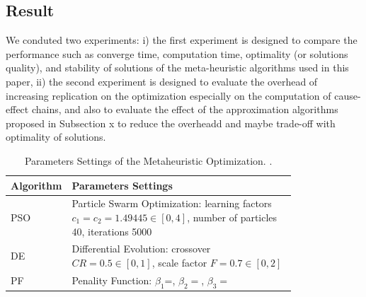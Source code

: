 \subsection{Result}
We conduted two experiments: i) the first experiment is designed to compare the performance  such as converge time, computation time, optimality (or solutions quality), and stability of solutions of the meta-heuristic algorithms used in this paper, ii) the second experiment is designed to evaluate the overhead of increasing replication on the optimization especially on the computation of cause-effect chains, and also to evaluate the effect of the approximation algorithms proposed in Subsection x to reduce the overheadd and maybe trade-off with optimality of solutions.
\begin{table}
	\centering\small
	\begin{tabular}{@{}lp{0.8\linewidth}@{}}
		\toprule
		Algorithm & Parameters Settings\\ 
		\midrule
		PSO	& Particle Swarm Optimization: learning factors $c_1=c_2=1.49445\in [0,4]$,  number of particles 40, iterations 5000	\\
		DE	& Differential Evolution: crossover $CR=0.5\in[0,1]$, scale factor $F=0.7\in[0,2]$  \\
		PF& Penality Function:  $\beta_1$=,  $\beta_2=$, $ \beta_3=$\\
		\bottomrule
	\end{tabular}
	\caption{Parameters Settings of the Metaheuristic Optimization. .}
	\label{tbl_para}
\end{table}

